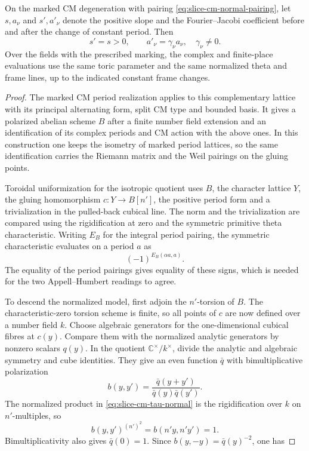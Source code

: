 \begin{proposition}
\label{prop:marked-cm-arc-base-change}
On the marked CM degeneration with pairing
\eqref{eq:slice-cm-normal-pairing}, let \(s,a_\nu\) and \(s',a'_\nu\) denote the positive slope and the Fourier--Jacobi coefficient before and after the change of constant period. Then
\[
 s'=s>0,\qquad a'_\nu=\gamma_\nu a_\nu,\quad\gamma_\nu\ne0.
\]
 Over the fields with the prescribed marking, the
complex and finite-place evaluations use the same toric parameter and
the same normalized theta and frame lines, up to the indicated constant
frame changes.
\end{proposition}

\begin{proof}
The marked CM period realization applies to this complementary
lattice with its principal alternating form, split CM type and
bounded basis. It gives a polarized abelian scheme \(B\) after a
finite number field extension and an identification of its complex
periods and CM action with the above ones. In this construction one
keeps the isometry of marked period lattices, so the same
identification carries the Riemann matrix and the Weil pairings on
the gluing points.

Toroidal uniformization for the isotropic
quotient uses \(B\), the character lattice \(Y\), the gluing
homomorphism \(c:Y\to B[n']\), the positive period form and a
trivialization in the pulled-back cubical line. The norm and the
trivialization are compared using the rigidification at zero and
the symmetric primitive theta characteristic. Writing \(E_B\) for the integral period pairing, the symmetric characteristic evaluates on a period \(a\) as
\[
  (-1)^{E_B(\alpha a,a)}.
\]
 The equality of
the period pairings gives equality of these signs, which is needed
for the two Appell--Humbert readings to agree.
\cite{faltings-chai}\label{cor:slice-cm-arc-model-2}

To descend the normalized model, first adjoin the \(n'\)-torsion
of \(B\). The characteristic-zero torsion scheme is finite, so
all points of \(c\) are now defined over a number field \(k\).
Choose algebraic generators for the one-dimensional cubical
fibres at \(c(y)\). Compare them with the normalized analytic
generators by nonzero scalars \(q(y)\). In the quotient \(\mathbb C^\times/k^\times\), divide the
analytic and algebraic symmetry and cube identities. They
give an even function \(\bar q\) with bimultiplicative
polarization
\[
 b(y,y')=\frac{\bar q(y+y')}{\bar q(y)\bar q(y')}.
\]
The normalized product in \eqref{eq:slice-cm-tau-normal} is
the rigidification over \(k\) on \(n'\)-multiples, so
\[
 b(y,y')^{(n')^2}=b(n'y,n'y')=1.
\]
Bimultiplicativity also gives \(\bar q(0)=1\).
Since \(b(y,-y)=\bar q(y)^{-2}\), one has


\end{proof}
